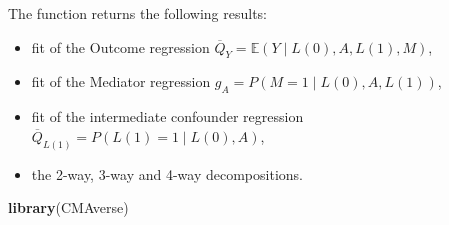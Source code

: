 \documentclass[
]{book}
\newenvironment{Shaded}{\begin{snugshade}}{\end{snugshade}}
\newcommand{\FunctionTok}[1]{\textcolor[rgb]{0.13,0.29,0.53}{\textbf{#1}}}
\newcommand{\NormalTok}[1]{#1}
\providecommand{\tightlist}{%
  \setlength{\itemsep}{0pt}\setlength{\parskip}{0pt}}
\begin{document}
The function returns the following results:

\begin{itemize}
\tightlist
\item
  fit of the Outcome regression \(\overline{Q}_Y = \mathbb{E}(Y \mid L(0),A,L(1),M)\),
\item
  fit of the Mediator regression \(g_A = P(M=1 \mid L(0),A,L(1))\),
\item
  fit of the intermediate confounder regression \(\overline{Q}_{L(1)} = P(L(1)=1\mid L(0),A)\),
\item
  the 2-way, 3-way and 4-way decompositions.
\end{itemize}

\begin{Shaded}
\begin{Highlighting}[]
\FunctionTok{library}\NormalTok{(CMAverse)}


\end{Highlighting}
\end{Shaded}
\end{document}
